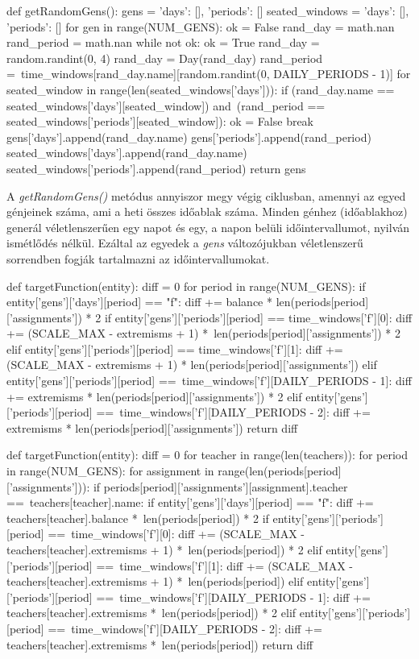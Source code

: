 \begin{python}
	def getRandomGens():
	gens = {'days': [], 'periods': []}
	seated_windows = {'days': [], 'periods': []}
	for gen in range(NUM_GENS):
	ok = False
	rand_day = math.nan
	rand_period = math.nan
	while not ok:
	ok = True
	rand_day = random.randint(0, 4)
	rand_day = Day(rand_day)
	rand_period =\
	time_windows[rand_day.name][random.randint(0, 
	DAILY_PERIODS - 1)]
	for seated_window in range(len(seated_windows['days'])):
	if (rand_day.name ==
	seated_windows['days'][seated_window]) and\
	(rand_period == 
	seated_windows['periods'][seated_window]):
	ok = False
	break
	gens['days'].append(rand_day.name)
	gens['periods'].append(rand_period)
	seated_windows['days'].append(rand_day.name)
	seated_windows['periods'].append(rand_period)
	return gens
\end{python}

A \textit{getRandomGens()} metódus annyiszor megy végig ciklusban, amennyi az egyed génjeinek száma, ami a heti összes időablak száma. Minden génhez (időablakhoz) generál véletlenszerűen egy napot és egy, a napon belüli időintervallumot, nyilván ismétlődés nélkül. Ezáltal az egyedek a \textit{gens} változójukban véletlenszerű sorrendben fogják tartalmazni az időintervallumokat.

\begin{python}
	def targetFunction(entity):
	diff = 0
	for period in range(NUM_GENS):
	if entity['gens']['days'][period] == "f":
	diff += balance * len(periods[period]['assignments']) * 2
	if entity['gens']['periods'][period] == time_windows['f'][0]:
	diff += (SCALE_MAX - extremisms + 1) *\
	len(periods[period]['assignments']) * 2
	elif entity['gens']['periods'][period] == time_windows['f'][1]:
	diff += (SCALE_MAX - extremisms + 1) * len(periods[period]['assignments'])
	elif entity['gens']['periods'][period] ==\
	time_windows['f'][DAILY_PERIODS - 1]:
	diff += extremisms * len(periods[period]['assignments']) * 2
	elif entity['gens']['periods'][period] ==\
	time_windows['f'][DAILY_PERIODS - 2]:
	diff += extremisms * len(periods[period]['assignments'])
	return diff
\end{python}

\begin{python}
	def targetFunction(entity):
	diff = 0
	for teacher in range(len(teachers)):
	for period in range(NUM_GENS):
	for assignment in range(len(periods[period]['assignments'])):
	if periods[period]['assignments'][assignment].teacher ==\
	teachers[teacher].name:
	if entity['gens']['days'][period] == "f":
	diff += teachers[teacher].balance *\
	len(periods[period]) * 2
	if entity['gens']['periods'][period] ==\
	time_windows['f'][0]:
	diff += (SCALE_MAX -
	teachers[teacher].extremisms + 1) *\
	len(periods[period]) * 2
	elif entity['gens']['periods'][period] ==\
	time_windows['f'][1]:
	diff += (SCALE_MAX -
	teachers[teacher].extremisms + 1) *\
	len(periods[period])
	elif entity['gens']['periods'][period] ==\
	time_windows['f'][DAILY_PERIODS - 1]:
	diff += teachers[teacher].extremisms *\
	len(periods[period]) * 2
	elif entity['gens']['periods'][period] ==\
	time_windows['f'][DAILY_PERIODS - 2]:
	diff += teachers[teacher].extremisms *\
	len(periods[period])
	return diff
\end{python}

